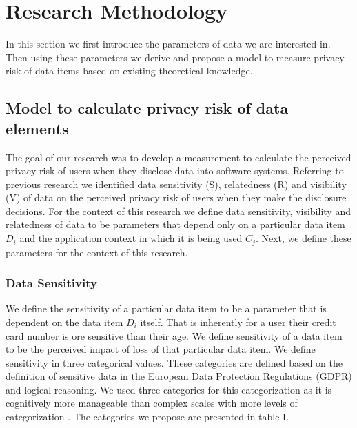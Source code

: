 \documentclass[10pt]{article}
\begin{document}
\section {Research Methodology}

In this section we first introduce the parameters of data we are interested in. Then using these parameters we derive and propose a model to measure privacy risk of data items based on existing theoretical knowledge.

\subsection {Model to calculate privacy risk of data elements}

The goal of our research was to develop a measurement to calculate the perceived privacy risk of users when they disclose data into software systems. Referring to previous research we identified data sensitivity (S), relatedness (R) and visibility (V) of data on the perceived privacy risk of users when they make the disclosure decisions. For the context of this research we define data sensitivity, visibility and relatedness of data to be parameters that depend only on a particular data item \textit{$D_i$} and the application context in which it is being used \textit{$C_j$}. Next, we define these parameters for the context of this research.

\subsubsection{Data Sensitivity} We define the sensitivity of a particular data item to be a parameter that is dependent on the data item \textit{$D_i$} itself. That is inherently for a user their credit card number is ore sensitive than their age. We define sensitivity of a data item to be the perceived impact of loss of that particular data item. We define sensitivity in three categorical values. These categories are defined based on the definition of sensitive data in the European Data Protection Regulations (GDPR) \cite {wagner2016national} and logical reasoning. We used three categories for this categorization as it is cognitively more manageable than complex scales with more levels of categorization \cite {oetzel2014systematic}. The categories we propose are presented in table I.  
\end{document}
